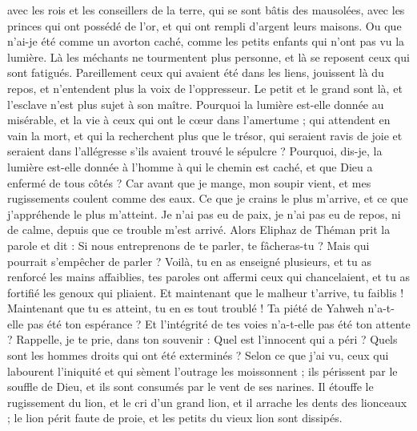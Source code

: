 \begin{multicols}{2}
avec les rois et les conseillers de la terre, qui se sont bâtis des mausolées,
avec les princes qui ont possédé de l'or, et qui ont rempli d'argent leurs maisons.
Ou que n'ai-je été comme un avorton caché, comme les petits enfants qui n'ont pas vu la lumière.
Là les méchants ne tourmentent plus personne, et là se reposent ceux qui sont fatigués. 
Pareillement ceux qui avaient été dans les liens, jouissent là du repos, et n'entendent plus la voix de l'oppresseur. 
Le petit et le grand sont là, et l'esclave n'est plus sujet à son maître.
Pourquoi la lumière est-elle donnée au misérable, et la vie à ceux qui ont le cœur dans l'amertume ;
qui attendent en vain la mort, et qui la recherchent plus que le trésor,
qui seraient ravis de joie et seraient dans l'allégresse s'ils avaient trouvé le sépulcre ?
Pourquoi, dis-je, la lumière est-elle donnée à l'homme à qui le chemin est caché, et que Dieu a enfermé de tous côtés ?
Car avant que je mange, mon soupir vient, et mes rugissements coulent comme des eaux.
Ce que je crains le plus m'arrive, et ce que j'appréhende le plus m'atteint. 
Je n'ai pas eu de paix, je n'ai pas eu de repos, ni de calme, depuis que ce trouble m'est arrivé. 
\VerseOne{}Alors Eliphaz de Théman prit la parole et dit :
Si nous entreprenons de te parler, te fâcheras-tu ? Mais qui pourrait s'empêcher de parler ?
Voilà, tu en as enseigné plusieurs, et tu as renforcé les mains affaiblies,
tes paroles ont affermi ceux qui chancelaient, et tu as fortifié les genoux qui pliaient.
Et maintenant que le malheur t'arrive, tu faiblis ! Maintenant que tu es atteint, tu en es tout troublé !
 Ta piété de Yahweh n'a-t-elle pas été ton espérance ? Et l'intégrité de tes voies n'a-t-elle pas été ton attente ? 
Rappelle, je te prie, dans ton souvenir : Quel est l'innocent qui a péri ? Quels sont les hommes droits qui ont été exterminés ?
Selon ce que j'ai vu, ceux qui labourent l'iniquité et qui sèment l'outrage les moissonnent ;
ils périssent par le souffle de Dieu, et ils sont consumés par le vent de ses narines.
Il étouffe le rugissement du lion, et le cri d'un grand lion, et il arrache les dents des lionceaux ;
le lion périt faute de proie, et les petits du vieux lion sont dissipés.

\end{multicols}
